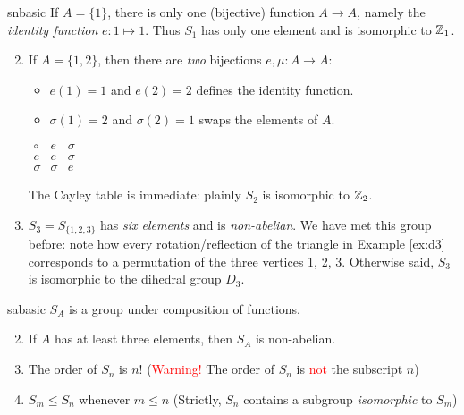 \begin{examples}{}{snbasic}
	\exstart If $A=\{1\}$, there is only one (bijective) function $A\to A$, namely the \emph{identity function} $e:1\mapsto 1$. Thus $S_1$ has only one element and is isomorphic to $\mathbb{Z}_1$.
	\begin{enumerate}\setcounter{enumi}{1}\itemsep0pt
	  \item If $A=\{1,2\}$, then there are \emph{two} bijections $e,\mu:A\to A$:\par
	  \begin{minipage}[t]{0.7\linewidth}\vspace{-10pt}
	    \begin{itemize}\itemsep0pt
	    	\item $e(1)=1$ and $e(2)=2$ defines the identity function.
	    	\item $\sigma(1)=2$ and $\sigma(2)=1$ swaps the elements of $A$.
	  	\end{itemize}
	  \end{minipage}\hfill\begin{minipage}[t]{0.29\linewidth}\vspace{-18pt}
	  \flushright%
	  $\begin{array}{c||c|c}
	  	\circ&e&\sigma\\\hline\hline
	 	 	e&e&\sigma\\\hline
	  	\sigma&\sigma&e
	  \end{array}$
	  \end{minipage}\par
	
	  The Cayley table is immediate: plainly $S_2$ is isomorphic to $\mathbb{Z}_2$.
	  
	  \item\label{ex:snbasic3} $S_3=S_{\{1,2,3\}}$ has \emph{six elements} and is \emph{non-abelian}. We have met this group before: note how every rotation/reflection of the triangle in Example \ref{ex:d3} corresponds to a permutation of the three vertices 1, 2, 3. Otherwise said, $S_3$ is isomorphic to the dihedral group $D_3$. 
	\end{enumerate}
\end{examples}

\begin{lemm}{}{sabasic}
	\exstart $S_A$ is a group under composition of functions.\vspace{-4pt}
	\begin{enumerate}\setcounter{enumi}{1}\itemsep0pt
	  \item If $A$ has at least three elements, then $S_A$ is non-abelian.
	  \item The order of $S_n$ is $n!$ \hfill (\textcolor{red}{Warning!} The order of $S_n$ is \textcolor{red}{not} the subscript $n$)
	  \item $S_m\le S_n$ whenever $m\le n$ \hfill(Strictly, $S_n$ contains a subgroup \emph{isomorphic} to $S_m$)
	\end{enumerate}
\end{lemm}

